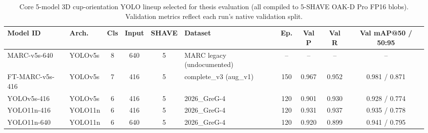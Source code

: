 \begin{table}[t]
  \centering
  \caption{Core 5-model 3D cup-orientation YOLO lineup selected for thesis evaluation (all compiled to 5-SHAVE OAK-D Pro FP16 blobs). Validation metrics reflect each run's native validation split.}
  \label{tab:paper5-models}
  \small
  \begin{tabular}{llccclcccc}
    \toprule
    Model ID & Arch. & Cls & Input & SHAVE & Dataset & Ep. & Val P & Val R & Val mAP@50 / 50:95 \\
    \midrule
    MARC-v5s-640 & YOLOv5s & 8 & 640 & 5 & MARC legacy (undocumented) & -- & -- & -- & -- \\
    FT-MARC-v5s-416 & YOLOv5s & 7 & 416 & 5 & complete\_v3 (aug\_v1) & 150 & 0.967 & 0.952 & 0.981 / 0.871 \\
    YOLOv5s-416 & YOLOv5s & 6 & 416 & 5 & 2026\_GreG-4 & 120 & 0.901 & 0.930 & 0.928 / 0.774 \\
    YOLO11n-416 & YOLO11n & 6 & 416 & 5 & 2026\_GreG-4 & 120 & 0.931 & 0.937 & 0.935 / 0.778 \\
    YOLO11n-640 & YOLO11n & 6 & 640 & 5 & 2026\_GreG-4 & 120 & 0.920 & 0.899 & 0.941 / 0.795 \\
    \bottomrule
  \end{tabular}
\end{table}
